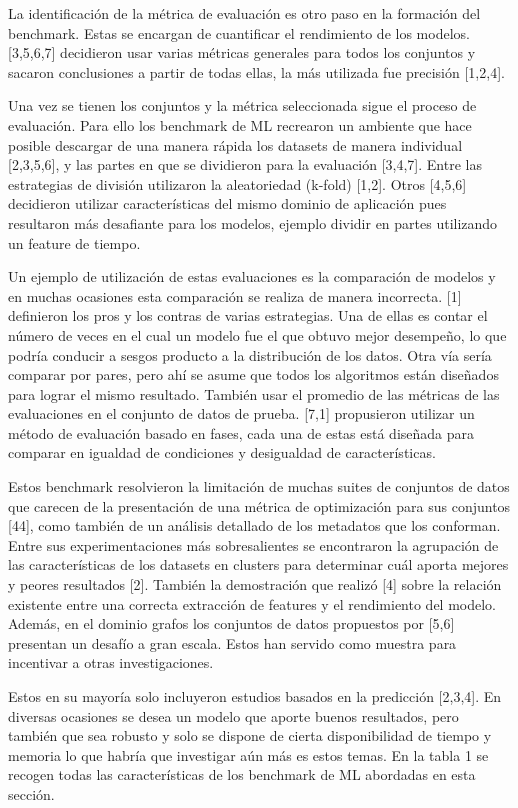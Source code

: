 La identificación de la métrica de evaluación es otro paso en la formación del benchmark. Estas se encargan de cuantificar el rendimiento de los modelos. [3,5,6,7] 
decidieron usar varias métricas generales para todos los conjuntos y sacaron conclusiones a partir de todas ellas, la más utilizada fue precisión [1,2,4].

Una vez se tienen los conjuntos y la métrica seleccionada sigue el proceso de evaluación. Para ello los benchmark de ML recrearon un ambiente que hace posible descargar 
de una manera rápida los datasets de manera individual [2,3,5,6], y las partes en que se dividieron para la evaluación [3,4,7]. Entre las estrategias de división 
utilizaron la aleatoriedad (k-fold) [1,2]. Otros [4,5,6] decidieron utilizar características del mismo dominio de aplicación pues resultaron más desafiante para los modelos, ejemplo 
dividir en partes utilizando un feature de tiempo.

Un ejemplo de utilización de estas evaluaciones es la comparación de modelos y en muchas ocasiones esta comparación se realiza de manera incorrecta. [1] 
definieron los pros y los contras de varias estrategias. Una de ellas es contar el número de veces en el cual un modelo fue el que obtuvo mejor desempeño, lo que podría 
conducir a sesgos producto a la distribución de los datos. Otra vía sería comparar por pares, pero ahí se asume que todos los algoritmos están diseñados para lograr el 
mismo resultado.  También usar el promedio de las métricas de las evaluaciones en el conjunto de datos de prueba. [7,1] propusieron utilizar un método de 
evaluación basado en fases, cada una de estas está diseñada para comparar en igualdad de condiciones y desigualdad de características.  

Estos benchmark resolvieron la limitación de muchas suites de conjuntos de datos que carecen de la presentación de una métrica de optimización para sus conjuntos [44], 
como también de un análisis detallado de los metadatos que los conforman. Entre sus experimentaciones más sobresalientes se encontraron la agrupación de las 
características de los datasets en clusters para determinar cuál aporta mejores y peores resultados [2]. También la demostración que realizó [4] sobre la relación 
existente entre una correcta extracción de features y el rendimiento del modelo. Además, en el dominio grafos los conjuntos de datos propuestos por [5,6] 
presentan un desafío a gran escala. Estos han servido como muestra para incentivar a otras investigaciones.

Estos en su mayoría solo incluyeron estudios basados en la predicción [2,3,4]. En diversas ocasiones se desea un modelo que aporte buenos resultados, pero también que 
sea robusto y solo se dispone de cierta disponibilidad de tiempo y memoria lo que habría que investigar aún más es estos temas. En la tabla 1 se recogen todas las 
características de los benchmark de ML abordadas en esta sección. 

